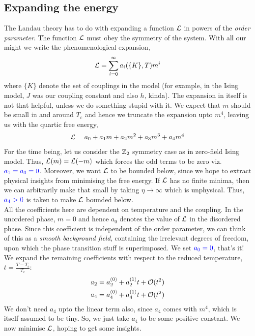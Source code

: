 \subsection{Expanding the energy}
The Landau theory has to do with expanding a function $\mathcal L$ in powers of the \textit{order parameter}. The function $\mathcal L$ must obey the symmetry of the system. With all our might we write the phenomenological expansion,
\begin{equation}
    \mathcal L = \sum\limits_{i=0}^\infty a_i(\{K\}, T) m^i
\end{equation}
where $\{K\}$ denote the set of couplings in the model (for example, in the Ising model, $J$ was our coupling constant and also $h$, kinda). The expansion in itself is not that helpful, unless we do something stupid with it. We expect that $m$ should be small in and around $T_c$ and hence we truncate the expansion upto $m^4$, leaving us with the quartic free energy,
$$\mathcal L = a_0 + a_1m +a_2m^2 + a_3m^3+a_4m^4 $$
For the time being, let us consider the $\mathbb{Z}_2$ symmetry case as in zero-field Ising model. Thus, $\mathcal L(m) = \mathcal L(-m)$ which forces the odd terms to be zero viz. $\mathcolor{blue}{a_1 = a_3=0}$. Moreover, we want $\mathcal L$ to be bounded below, since we hope to extract physical insights from minimising the free energy. If $\mathcal L$ has no finite minima, then we can arbitrarily make that small by taking $\eta\to \infty$ which is unphysical. Thus, $\mathcolor{blue}{a_4>0}$ is taken to make $\mathcal L$ bounded below. \\[0.2cm]
All the coefficients here are dependent on temperature and the coupling. In the unordered phase, $m=0$ and hence $a_0$ denotes the value of $\mathcal L$ in the disordered phase. Since this coefficient is independent of the order parameter, we can think of this as a \textit{smooth background field}, containing the irrelevant degrees of freedom, upon which the phase transition stuff is superimposed. We set $\mathcolor{blue}{a_0 = 0}$, that's it!
We expand the remaining coefficients with respect to the reduced temperature, $t = \frac{T-T_c}{T_c}$:
\begin{align}
   \begin{split}
     a_2 &= a_2^{(0)} + a_2^{(1)}t + \mathcal O(t^2)\\
    a_4 &= a_4^{(0)} + a_4^{(1)}t + \mathcal O(t^2)
   \end{split}
\end{align}
We don't need $a_4$ upto the linear term also, since $a_4$ comes with $m^4$, which is itself assumed to be tiny. So, we just take $a_4$ to be some positive constant. We now minimise $\mathcal L$, hoping to get some insights. 

